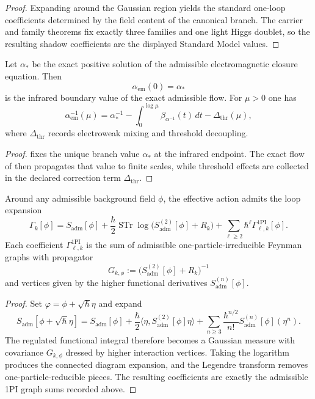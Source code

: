 \begin{proof}
Expanding  around the Gaussian region yields the standard
one-loop coefficients determined by the field content of the canonical branch. The carrier and
family theorems fix exactly three families and one light Higgs doublet, so the resulting shadow
coefficients are the displayed Standard Model values.
\end{proof}

\begin{corollary}
\label{cor:em-ir-boundary-condition}
Let $\alpha_\ast$ be the exact positive solution of the admissible electromagnetic closure equation.
Then
\[
\alpha_{\mathrm{em}}(0)=\alpha_\ast
\]
is the infrared boundary value of the exact admissible flow. For $\mu>0$ one has
\[
\alpha_{\mathrm{em}}^{-1}(\mu)
=
\alpha_\ast^{-1}
-\int_0^{\log\mu}\beta_{\alpha^{-1}}(t)\,dt
-\Delta_{\mathrm{thr}}(\mu),
\]
where $\Delta_{\mathrm{thr}}$ records electroweak mixing and threshold decoupling.
\end{corollary}

\begin{proof}
 fixes the unique branch value $\alpha_\ast$ at the infrared endpoint.
The exact flow of  then propagates that value to finite scales,
while threshold effects are collected in the declared correction term $\Delta_{\mathrm{thr}}$.
\end{proof}

\begin{theorem}
\label{thm:admissible-1pi-graph-expansion}
Around any admissible background field $\phi$, the effective action admits the loop expansion
\[
\Gamma_k[\phi]
=
S_{\mathrm{adm}}[\phi]
+\frac{\hbar}{2}\operatorname{STr}\log\!\bigl(S_{\mathrm{adm}}^{(2)}[\phi]+R_k\bigr)
+\sum_{\ell\ge 2}\hbar^\ell\Gamma_{\ell,k}^{\mathrm{1PI}}[\phi].
\]
Each coefficient $\Gamma_{\ell,k}^{\mathrm{1PI}}$ is the sum of admissible one-particle-irreducible
Feynman graphs with propagator
\[
G_{k,\phi}:=\bigl(S_{\mathrm{adm}}^{(2)}[\phi]+R_k\bigr)^{-1}
\]
and vertices given by the higher functional derivatives $S_{\mathrm{adm}}^{(n)}[\phi]$.
\end{theorem}

\begin{proof}
Set $\varphi=\phi+\sqrt{\hbar}\eta$ and expand
\[
S_{\mathrm{adm}}[\phi+\sqrt{\hbar}\eta]
=
S_{\mathrm{adm}}[\phi]
+\frac{\hbar}{2}\langle \eta,S_{\mathrm{adm}}^{(2)}[\phi]\eta\rangle
+\sum_{n\ge 3}\frac{\hbar^{n/2}}{n!}S_{\mathrm{adm}}^{(n)}[\phi](\eta^n).
\]
The regulated functional integral therefore becomes a Gaussian measure with covariance
$G_{k,\phi}$ dressed by higher interaction vertices. Taking the logarithm produces the connected
diagram expansion, and the Legendre transform removes one-particle-reducible pieces. The resulting
coefficients are exactly the admissible 1PI graph sums recorded above.
\end{proof}

